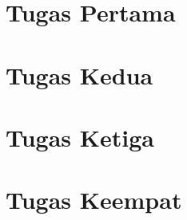 \documentclass{wileySix}
\begin{document}
\chapter{Tugas Pertama}
%
%
%
%
%
%
%
%
%
%
%
%
%
%
%
%
%
%
%
\chapter{Tugas Kedua}
%
%
%
%
%
%
%
%
%
%
%
%
%
%
%
%
%
%
%
%
%
\chapter{Tugas Ketiga}
%
%
%
%
%
%
%
%
%
%
%
%
%
%
%
%
%
%
%
%
\chapter{Tugas Keempat}




















\end{document}
